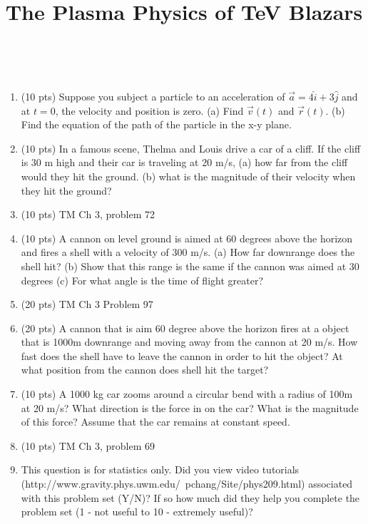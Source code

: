 \documentclass[12pt]{article}
\newcommand{\ihat}{\hat{i}}
\newcommand{\jhat}{\hat{j}}
\begin{document}
\title{The Plasma Physics of TeV Blazars}

\\
\bigskip
\begin{enumerate}

\item (10 pts) Suppose you subject a particle to an acceleration of $\vec{a} = 4 \ihat + 3 \jhat$ and at $t=0$, the velocity and position is zero. (a) Find $\vec{v}(t)$ and $\vec{r}(t)$. (b) Find the equation of the path of the particle in the x-y plane. 

\item (10 pts) In a famous scene, Thelma and Louis drive a car of a cliff. If the cliff is 30 m high and their car is traveling at 20 m/s, (a) how far from the cliff would they hit the ground.  (b) what is the magnitude of their velocity when they hit the ground? 

\item (10 pts) TM Ch 3, problem 72 

\item (10 pts) A cannon on level ground is aimed at 60 degrees above the horizon and fires a shell with a velocity of 300 m/s.  (a) How far downrange does the shell hit? (b) Show that this range is the same if the cannon was aimed at 30 degrees (c) For what angle is the time of flight greater?

\item (20 pts) TM Ch 3 Problem 97

\item (20 pts) A cannon that is aim 60 degree above the horizon fires at a object that is 1000m downrange and moving away from the cannon at 20 m/s.  How fast does the shell have to leave the cannon in order to hit the object?  At what position from the cannon does shell hit the target?     

\item (10 pts) A 1000 kg car zooms around a circular bend with a radius of 100m at 20 m/s? What direction is the force in on the car?  What is the magnitude of this force? Assume that the car remains at constant speed. 

\item (10 pts) TM Ch 3, problem 69

\item This question is for statistics only.  Did you view video tutorials \\
(http://www.gravity.phys.uwm.edu/~pchang/Site/phys209.html) associated with this problem set (Y/N)? If so how much did they help you complete the problem set (1 - not useful to 10 - extremely useful)?
\end{enumerate}
\end{document}
